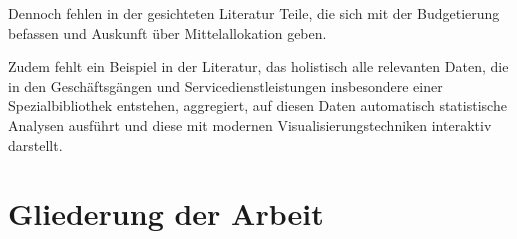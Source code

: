 Dennoch fehlen in der gesichteten Literatur Teile, die sich mit der Budgetierung
befassen und Auskunft über Mittelallokation geben.

Zudem fehlt ein Beispiel in der Literatur, das holistisch alle relevanten Daten, die in den
Geschäftsgängen und Servicedienstleistungen insbesondere einer Spezialbibliothek entstehen,
aggregiert, auf diesen Daten automatisch statistische Analysen ausführt und diese mit modernen Visualisierungstechniken
interaktiv darstellt.

\section{Gliederung der Arbeit}

